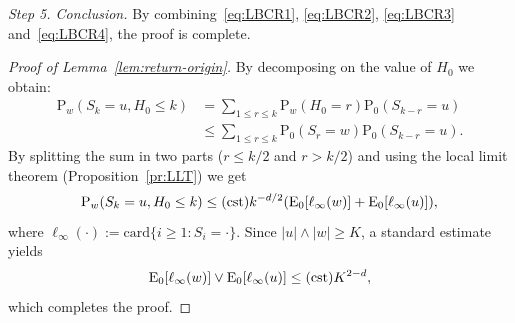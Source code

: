 \documentclass[a4paper,11pt]{amsart}
\numberwithin{equation}{section}
\newcommand\bP{\ensuremath{\mathrm{P}}}
\newcommand\bE{\ensuremath{\mathrm{E}}}
\newcommand{\card}{\mathrm{card}}
\newcommand{\8}{\infty}
\newcommand{\beq}{\begin{equation}}
\newcommand{\eeq}{\end{equation}}
\newcommand{\ba}{\begin{aligned}}
\newcommand{\ea}{\end{aligned}}
\begin{document}
{\it Step 5. Conclusion.} By combining~\eqref{eq:LBCR1}, \eqref{eq:LBCR2}, \eqref{eq:LBCR3} and~\eqref{eq:LBCR4}, the proof is complete.


\begin{proof}[Proof of Lemma~\ref{lem:return-origin}]
By decomposing on the value of $H_0$ we obtain:
\beq
\ba
\bP_w(S_k=u, H_0 \le k) &=
\sum_{1\le r\le k} \bP_w(H_0=r)\bP_0(S_{k-r}=u)\\
&\le \sum_{1\le r \le k}\bP_0(S_r=w)\bP_0(S_{k-r}=u).
\ea
\eeq
By splitting the sum in two parts ($r\le k/2$ and $r>k/2$) and using the local limit theorem (Proposition~\ref{pr:LLT}) we get
\beq
\bP_w(S_k=u, H_0 \le k) \le {\rm (cst)} k^{-d/2}(\bE_0[\ell_\infty(w)]+\bE_0[\ell_\infty(u)]),
\eeq
where $\ell_\infty(\cdot):= \card\{i\ge 1\colon S_i = \cdot\}$. Since $|u|\wedge|w|\ge K$, a standard estimate yields
\beq
\bE_0[\ell_\infty(w)]\vee \bE_0[\ell_\infty(u)] \le {\rm (cst)} K^{2-d},
\eeq
which completes the proof.
\end{proof}





\end{document}
